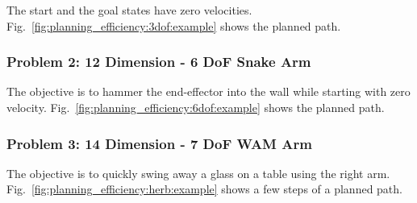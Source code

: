 \documentclass[letterpaper, 10 pt, conference]{ieeeconf}  %
\begin{document}
The start and the goal states have zero velocities.
Fig.~\ref{fig:planning_efficiency:3dof:example} shows the planned path.

\subsubsection{Problem 2: 12 Dimension - 6 DoF Snake Arm}

The objective is to hammer the end-effector into the wall while starting with zero velocity.
Fig.~\ref{fig:planning_efficiency:6dof:example} shows the planned path.

\subsubsection{Problem 3: 14 Dimension - 7 DoF WAM Arm}

The objective is to quickly swing away a glass on a table using the right arm.
Fig.~\ref{fig:planning_efficiency:herb:example} shows a few steps of a planned path.
\end{document}
